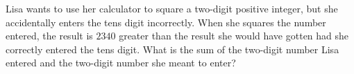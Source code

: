 Lisa wants to use her calculator to square a two-digit positive integer, but she accidentally enters the tens digit incorrectly. When she squares the number entered, the result is $2340$ greater than the result she would have gotten had she correctly entered the tens digit. What is the sum of the two-digit number Lisa entered and the two-digit number she meant to enter?
